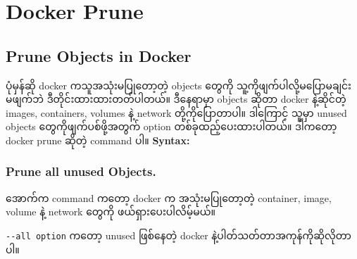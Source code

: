 \pagebreak

\hypertarget{docker-prune}{%
\section{Docker Prune}\label{docker-prune}}

\hypertarget{prune-objects-in-docker}{%
\subsection{Prune Objects in Docker}\label{prune-objects-in-docker}}

ပုံမှန်ဆို docker ကသူအသုံးမပြုတော့တဲ့ objects ‌တွေကို
သူ့ကိုဖျက်ပါလို့မပြောမချင်း မဖျက်ဘဲ ဒီတိုင်းထားထားတတ်ပါတယ်။ ဒီနေရာမှာ
objects ဆိုတာ docker နဲ့ဆိုင်တဲ့ images, containers, volumes နဲ့ network
တို့ကိုပြောတာပါ။ ဒါကြောင့် သူ့မှာ unused objects တွေကိုဖျက်ပစ်ဖို့အတွက်
option တစ်ခုထည့်ပေးထားပါတယ်။ ဒါကတော့ docker prune ဆိုတဲ့ command ပါ။
\textbf{Syntax:}

\begin{Shaded}
\begin{Highlighting}[]
\NormalTok{$ }
\end{Highlighting}
\end{Shaded}

\hypertarget{prune-all-unused-objects.}{%
\subsubsection{Prune all unused
Objects.}\label{prune-all-unused-objects.}}

အောက်က command ကတော့ docker က အသုံးမပြုတော့တဲ့ container, image, volume
နဲ့ network တွေကို ဖယ်ရှားပေးပါလိမ့်မယ်။

\begin{Shaded}
\begin{Highlighting}[]
\NormalTok{$ }
\end{Highlighting}
\end{Shaded}

\texttt{-\/-‌all\ option} ကတော့ unused ဖြစ်နေတဲ့ docker
နဲ့ပါတ်သတ်တာအကုန်ကိုဆိုလိုတာပါ။

\begin{Shaded}
\begin{Highlighting}[]
\NormalTok{$ }
\end{Highlighting}
\end{Shaded}

